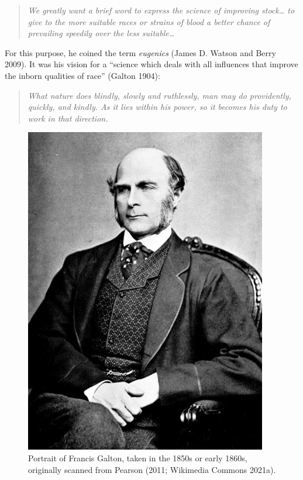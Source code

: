 \documentclass[
]{book}
\begin{document}
\begin{quote}
\emph{We greatly want a brief word to express the science of improving stock\ldots{} to give to the more suitable races or strains of blood a better chance of prevailing speedily over the less suitable\ldots{}}
\end{quote}

For this purpose, he coined the term \emph{eugenics} (James D. Watson and Berry 2009). It was his vision for a ``science which deals with all influences that improve the inborn qualities of race'' (Galton 1904):

\begin{quote}
\emph{What nature does blindly, slowly and ruthlessly, man may do providently, quickly, and kindly. As it lies within his power, so it becomes his duty to work in that direction.}
\end{quote}



\begin{figure}

{\centering \includegraphics[width=0.7\linewidth]{figs/introduction/Francis_Galton_1850s} 

}

\caption{Portrait of Francis Galton, taken in the 1850s or early 1860s, originally scanned from Pearson (2011; Wikimedia Commons 2021a).}\label{fig:galton}
\end{figure}
\end{document}
